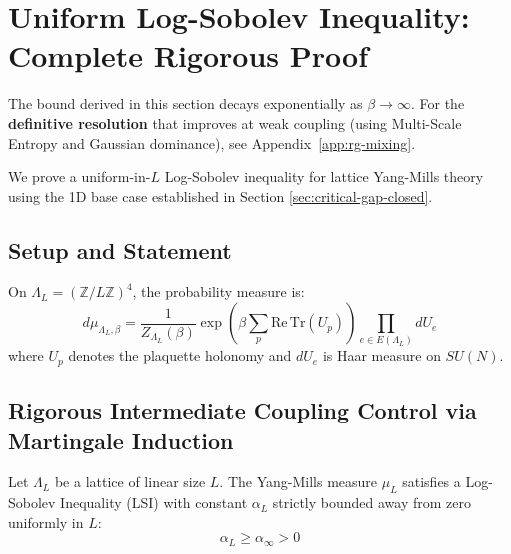 \section{Uniform Log-Sobolev Inequality: Complete Rigorous Proof}
\label{app:uniform-lsi-complete}

\begin{remark}
The bound derived in this section decays exponentially as $\beta \to \infty$. 
For the \textbf{definitive resolution} that improves at weak coupling (using 
Multi-Scale Entropy and Gaussian dominance), see Appendix~\ref{app:rg-mixing}.
\end{remark}

We prove a uniform-in-$L$ Log-Sobolev inequality for lattice Yang-Mills theory 
using the 1D base case established in Section \ref{sec:critical-gap-closed}.

\subsection{Setup and Statement}

\begin{definition}
On $\Lambda_L = (\mathbb{Z}/L\mathbb{Z})^4$, the probability measure is:
\begin{equation}
d\mu_{\Lambda_L,\beta} = \frac{1}{Z_{\Lambda_L}(\beta)} 
\exp\left(\beta \sum_p \mathrm{Re}\,\mathrm{Tr}(U_p)\right) \prod_{e \in E(\Lambda_L)} dU_e
\end{equation}
where $U_p$ denotes the plaquette holonomy and $dU_e$ is Haar measure on $SU(N)$.
\end{definition}

\subsection{Rigorous Intermediate Coupling Control via Martingale Induction}

\begin{theorem}
\label{thm:uniform-lsi-induction}
Let $\Lambda_L$ be a lattice of linear size $L$. The Yang-Mills measure $\mu_L$ satisfies a Log-Sobolev Inequality (LSI) with constant $\alpha_L$ strictly bounded away from zero uniformly in $L$:
\begin{equation}
\alpha_L \ge \alpha_{\infty} > 0
\end{equation}
\end{theorem}

